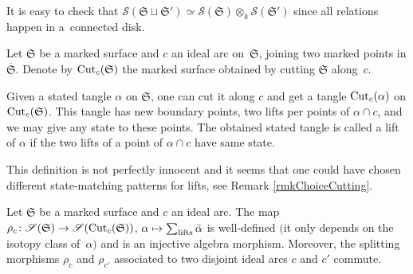 \begin{Remark}
It is easy to check that $\mathscr{S}(\mathfrak{S} \sqcup \mathfrak{S}') \simeq \mathscr{S}(\mathfrak{S}) \otimes_k \mathscr{S}(\mathfrak{S}')$ since all relations happen in a~connected disk.
\end{Remark}

\begin{Definition} 
Let $\mathfrak{S}$ be a marked surface and $c$ an ideal arc on~$\mathfrak{S}$, joining two marked points in $\overline{\mathfrak{S}}$. Denote by ${\rm Cut}_c(\mathfrak{S})$ the marked surface obtained by cutting $\mathfrak{S}$ along~$c$.

Given a stated tangle $\alpha$ on $\mathfrak{S}$, one can cut it along $c$ and get a tangle ${\rm Cut}_c(\alpha)$ on ${\rm Cut}_c(\mathfrak{S})$. This tangle has new boundary points, two lifts per points of $\alpha \cap c$, and we may give any state to these points. The obtained stated tangle is called a lift of $\alpha$ if the two lifts of a point of $\alpha \cap c$ have same state.
\end{Definition}

This definition is not perfectly innocent and it seems that one could have chosen different state-matching patterns for lifts, see Remark \ref{rmkChoiceCutting}.

\begin{Theorem}\label{splitmorph} Let $\mathfrak{S}$ be a marked surface and $c$ an ideal arc. The map $\rho_c\colon \mathscr{S}(\mathfrak{S}) \to \mathscr{S}({\rm Cut}_c(\mathfrak{S}))$, $\alpha \mapsto \sum_{\rm lifts} \tilde{\alpha}$ is well-defined $($it only depends on the isotopy class of~$\alpha)$ and is an injective algebra morphism. Moreover, the splitting morphisms $\rho_c$ and $\rho_{c'}$ associated to two disjoint ideal arcs $c$ and $c'$ commute.
\end{Theorem}

